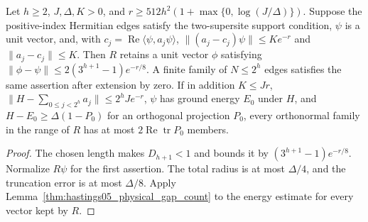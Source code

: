 \begin{lemma}
    \label{thm:hastings05_quantitative_periodic}
    \leanok
    Let $h\ge2$, $J,\Delta,K>0$, and
    $r\ge512h^2(1+\max\{0,\log(J/\Delta)\})$.
    Suppose the positive-index Hermitian edges satisfy the two-supersite support condition,
    $\psi$ is a unit vector, and, with
    $c_j=\operatorname{Re}\langle\psi,a_j\psi\rangle$,
    $\|(a_j-c_j)\psi\|\le K e^{-r}$ and $\|a_j-c_j\|\le K$.
    Then $R$ retains a unit vector $\phi$ satisfying
    $\|\phi-\psi\|\le2(3^{h+1}-1)e^{-r/8}$.
    A finite family of $N\le2^h$ edges satisfies the same assertion after
    extension by zero.
    If in addition $K\le Jr$,
    $\|H-\sum_{0\le j<2^h}a_j\|\le2^hJe^{-r}$,
    $\psi$ has ground energy $E_0$ under $H$, and
    $H-E_0\ge\Delta(1-P_0)$ for an orthogonal projection $P_0$,
    every orthonormal family in the range of $R$
    has at most $2\operatorname{Re}\operatorname{tr}P_0$ members.
\end{lemma}
\begin{proof}\leanok
    The chosen length makes $D_{h+1}<1$ and bounds it by
    $(3^{h+1}-1)e^{-r/8}$. Normalize $R\psi$ for the first assertion.
    The total radius is at most $\Delta/4$, and the truncation error is at
    most $\Delta/8$. Apply Lemma~\ref{thm:hastings05_physical_gap_count}
    to the energy estimate for every vector kept by $R$.
\end{proof}
